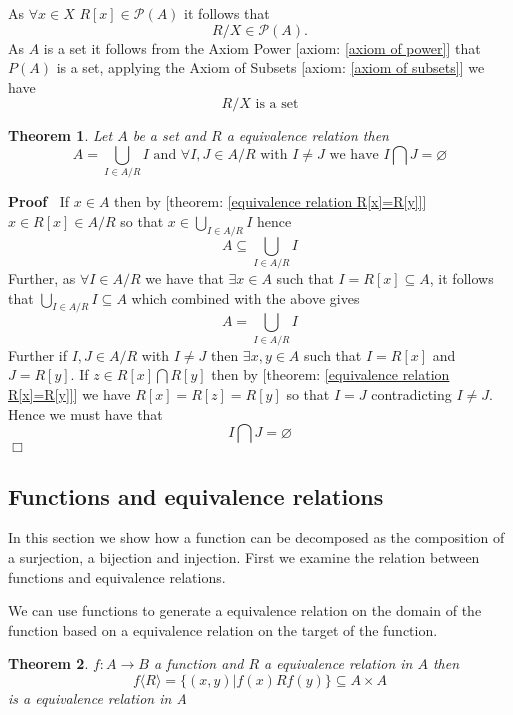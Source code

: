 \documentclass{book}
\newenvironment{proof}{\noindent\textbf{Proof\ }}{\hspace*{\fill}$\Box$\medskip}
\newtheorem{theorem}{Theorem}
\begin{document}
\begin{note}
  As $\forall x \in X$ $R [x] \in \mathcal{P} (A)$ it follows that
  \[ R / X \in \mathcal{P} (A) . \]
  As $A$ is a set it follows from the Axiom Power [axiom: \ref{axiom of
  power}] that $P (A)$ is a set, applying the Axiom of Subsets [axiom:
  \ref{axiom of subsets}] we have
  \[ R / X \text{ is a set} \]
\end{note}

\begin{theorem}
  \label{equivalence relation defines a partition (1)}Let $A$ be a set and $R$
  a equivalence relation then
  \[ A = \bigcup_{I \in A / R} I \text{ and $\forall I, J \in A / R$ with } I
     \neq J \text{ we have } I \bigcap J = \varnothing \]
\end{theorem}

\begin{proof}
  If $x \in A$ then by [theorem: \ref{equivalence relation R[x]=R[y]}] \ $x
  \in R [x] \in A / R$ so that $x \in \bigcup_{I \in A / R} I$ hence
  \[ A \subseteq \bigcup_{I \in A / R} I \]
  Further, as $\forall I \in A / R$ we have that $\exists x \in A$ such that
  $I = R [x] \subseteq A$, it follows that $\bigcup_{I \in A / R} I \subseteq
  A$ which combined with the above gives
  \[ A = \bigcup_{I \in A / R} I \]
  Further if $I, J \in A / R$ with $I \neq J$ then $\exists x, y \in A$ such
  that $I = R [x]$ and $J = R [y]$. If $z \in R [x] \bigcap R [y]$ then by
  [theorem: \ref{equivalence relation R[x]=R[y]}] we have $R [x] = R [z] = R
  [y]$ so that $I = J$ contradicting $I \neq J$. Hence we must have that
  \[ I \bigcap J = \varnothing \]
\end{proof}

\subsection{Functions and equivalence relations}

In this section we show how a function can be decomposed as the composition of
a surjection, a bijection and injection. First we examine the relation between
functions and equivalence relations.

We can use functions to generate a equivalence relation on the domain of the
function based on a equivalence relation on the target of the function.

\begin{theorem}
  \label{equivalence relation function}$f : A \rightarrow B$ a function and
  $R$ a equivalence relation in $A$ then
  \[ f \langle R \rangle = \{ (x, y) |f (x) R f (y) \} \subseteq A \times A
  \]
  is a equivalence relation in A
\end{theorem}
\end{document}
